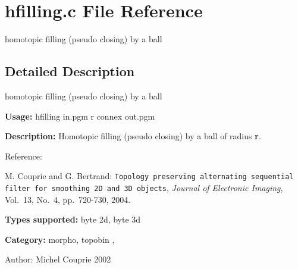 \section{hfilling.c File Reference}
\label{hfilling_8c}
homotopic filling (pseudo closing) by a ball 



\subsection{Detailed Description}
homotopic filling (pseudo closing) by a ball 

{\bf Usage:} hfilling in.pgm r connex out.pgm

{\bf Description:} Homotopic filling (pseudo closing) by a ball of radius {\bf r}.

Reference:\par
 [CB04] M. Couprie and G. Bertrand: {\tt Topology preserving alternating sequential filter for smoothing 2D and 3D objects}, {\em  Journal of Electronic Imaging\/}, Vol.~13, No.~4, pp.~720-730, 2004.

{\bf Types supported:} byte 2d, byte 3d

{\bf Category:} morpho, topobin ,

\begin{Desc}
\item[Author:]Michel Couprie 2002 \end{Desc}

